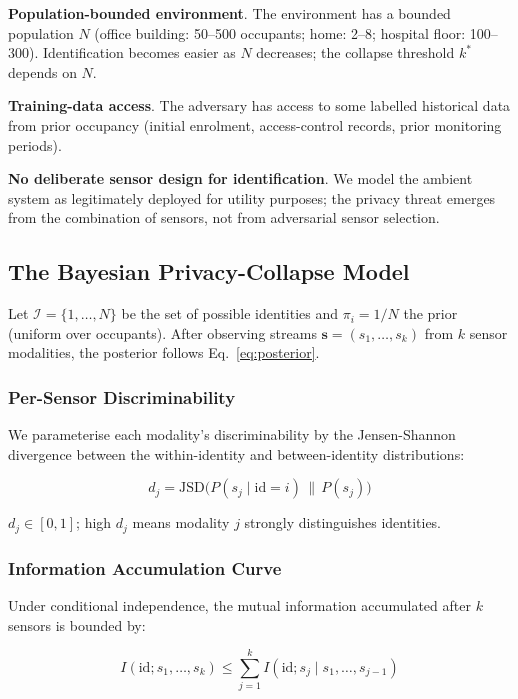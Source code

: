 \documentclass[sigconf,nonacm]{acmart}
\begin{document}
\textbf{Population-bounded environment}. The environment has a
bounded population $N$ (office building: 50--500 occupants;
home: 2--8; hospital floor: 100--300). Identification becomes
easier as $N$ decreases; the collapse threshold $k^*$ depends
on $N$.

\textbf{Training-data access}. The adversary has access to some
labelled historical data from prior occupancy (initial
enrolment, access-control records, prior monitoring periods).

\textbf{No deliberate sensor design for identification}. We
model the ambient system as legitimately deployed for utility
purposes; the privacy threat emerges from the combination of
sensors, not from adversarial sensor selection.

\subsection{The Bayesian Privacy-Collapse Model}

Let $\mathcal{I} = \{1, \ldots, N\}$ be the set of possible
identities and $\pi_i = 1/N$ the prior (uniform over occupants).
After observing streams $\mathbf{s} = (s_1, \ldots, s_k)$ from
$k$ sensor modalities, the posterior follows Eq.~\ref{eq:posterior}.

\subsubsection{Per-Sensor Discriminability}

We parameterise each modality's discriminability by the
Jensen-Shannon divergence between the within-identity and
between-identity distributions:

\begin{equation}
  d_j = \text{JSD}\bigl(P(s_j \mid \text{id}=i) \,\|\,
  P(s_j)\bigr)
\end{equation}

$d_j \in [0, 1]$; high $d_j$ means modality $j$ strongly
distinguishes identities.

\subsubsection{Information Accumulation Curve}

Under conditional independence, the mutual information
accumulated after $k$ sensors is bounded by:

\begin{equation}
  I(\text{id}; s_1,\ldots,s_k) \leq \sum_{j=1}^{k}
  I(\text{id}; s_j \mid s_1,\ldots,s_{j-1})
\label{eq:accumulation}
\end{equation}
\end{document}
